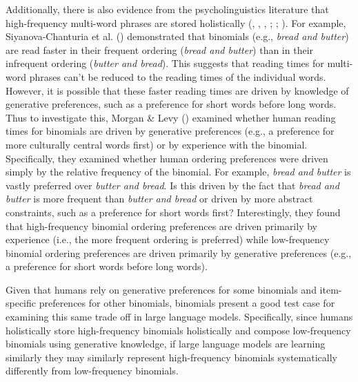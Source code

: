 \documentclass[
  12pt,
  letterpaper,
]{scrreport}
\begin{document}
Additionally, there is also evidence from the psycholinguistics
literature that high-frequency multi-word phrases are stored
holistically (,
,
,
;
;
). For example, Siyanova-Chanturia et al.
()
demonstrated that binomials (e.g., \emph{bread and butter}) are read
faster in their frequent ordering (\emph{bread and butter}) than in
their infrequent ordering (\emph{butter and bread}). This suggests that
reading times for multi-word phrases can't be reduced to the reading
times of the individual words. However, it is possible that these faster
reading times are driven by knowledge of generative preferences, such as
a preference for short words before long words. Thus to investigate
this, Morgan \& Levy
() examined
whether human reading times for binomials are driven by generative
preferences (e.g., a preference for more culturally central words first)
or by experience with the binomial. Specifically, they examined whether
human ordering preferences were driven simply by the relative frequency
of the binomial. For example, \emph{bread and butter} is vastly
preferred over \emph{butter and bread}. Is this driven by the fact that
\emph{bread and butter} is more frequent than \emph{butter and bread} or
driven by more abstract constraints, such as a preference for short
words first? Interestingly, they found that high-frequency binomial
ordering preferences are driven primarily by experience (i.e., the more
frequent ordering is preferred) while low-frequency binomial ordering
preferences are driven primarily by generative preferences (e.g., a
preference for short words before long words).

Given that humans rely on generative preferences for some binomials and
item-specific preferences for other binomials, binomials present a good
test case for examining this same trade off in large language models.
Specifically, since humans holistically store high-frequency binomials
holistically and compose low-frequency binomials using generative
knowledge, if large language models are learning similarly they may
similarly represent high-frequency binomials systematically differently
from low-frequency binomials.
\end{document}
